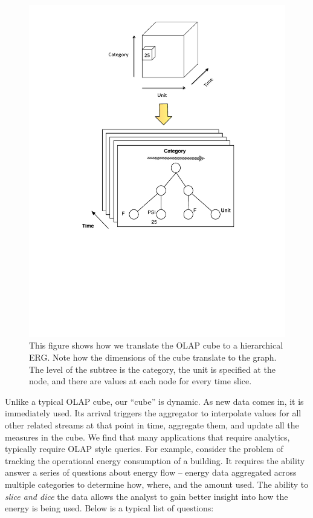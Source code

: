 \begin{figure}[h!] %
\centering
\includegraphics[width=.55\columnwidth]{figs/olaptoerg}
\caption{This figure shows how we translate the OLAP cube to a hierarchical ERG.  Note how the dimensions of the cube translate
to the graph.  The level of the subtree is the category, the unit is specified at the node, and there are values at each node
for every time slice.}
\label{fig:olap2erg}
\end{figure}

Unlike a typical OLAP cube, our ``cube'' is dynamic.  As new data comes in, it is immediately used.  Its arrival triggers
the aggregator to interpolate values for all other related streams at that point in time, aggregate them, and update all
the measures in the cube.  We find that many applications that require analytics, typically require OLAP style queries.
For example, consider the problem of tracking the operational energy consumption of a building.  
It requires the ability answer a series of questions
about energy flow -- energy data aggregated across multiple categories to determine how, where, and the amount used.  
The ability to \emph{slice and dice} the data allows the analyst to gain better insight into how the energy is being used.
Below is a typical list of questions:

